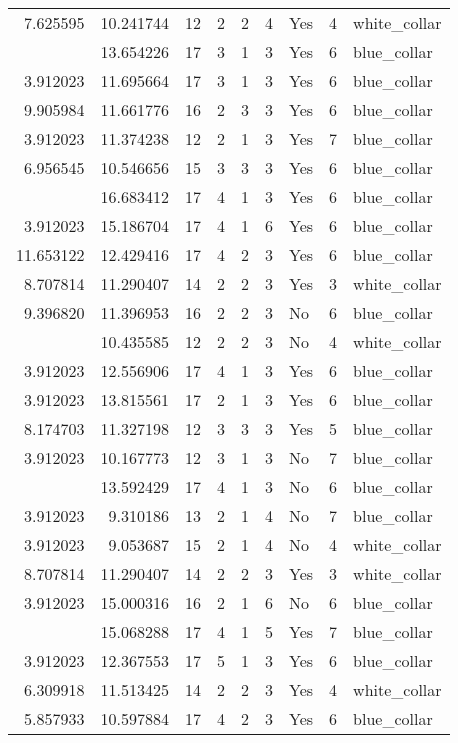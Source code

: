 \documentclass[
]{article}
\begin{document}
\begin{longtable}[t]{rrrrrllrl}
7.625595 & 10.241744 & 12 & 2 & 2 & 4 & Yes & 4 & white\_collar\\
\addlinespace
3.912023 & 13.654226 & 17 & 3 & 1 & 3 & Yes & 6 & blue\_collar\\
3.912023 & 11.695664 & 17 & 3 & 1 & 3 & Yes & 6 & blue\_collar\\
9.905984 & 11.661776 & 16 & 2 & 3 & 3 & Yes & 6 & blue\_collar\\
3.912023 & 11.374238 & 12 & 2 & 1 & 3 & Yes & 7 & blue\_collar\\
6.956545 & 10.546656 & 15 & 3 & 3 & 3 & Yes & 6 & blue\_collar\\
\addlinespace
3.912023 & 16.683412 & 17 & 4 & 1 & 3 & Yes & 6 & blue\_collar\\
3.912023 & 15.186704 & 17 & 4 & 1 & 6 & Yes & 6 & blue\_collar\\
11.653122 & 12.429416 & 17 & 4 & 2 & 3 & Yes & 6 & blue\_collar\\
8.707814 & 11.290407 & 14 & 2 & 2 & 3 & Yes & 3 & white\_collar\\
9.396820 & 11.396953 & 16 & 2 & 2 & 3 & No & 6 & blue\_collar\\
\addlinespace
4.248495 & 10.435585 & 12 & 2 & 2 & 3 & No & 4 & white\_collar\\
3.912023 & 12.556906 & 17 & 4 & 1 & 3 & Yes & 6 & blue\_collar\\
3.912023 & 13.815561 & 17 & 2 & 1 & 3 & Yes & 6 & blue\_collar\\
8.174703 & 11.327198 & 12 & 3 & 3 & 3 & Yes & 5 & blue\_collar\\
3.912023 & 10.167773 & 12 & 3 & 1 & 3 & No & 7 & blue\_collar\\
\addlinespace
3.912023 & 13.592429 & 17 & 4 & 1 & 3 & No & 6 & blue\_collar\\
3.912023 & 9.310186 & 13 & 2 & 1 & 4 & No & 7 & blue\_collar\\
3.912023 & 9.053687 & 15 & 2 & 1 & 4 & No & 4 & white\_collar\\
8.707814 & 11.290407 & 14 & 2 & 2 & 3 & Yes & 3 & white\_collar\\
3.912023 & 15.000316 & 16 & 2 & 1 & 6 & No & 6 & blue\_collar\\
\addlinespace
3.912023 & 15.068288 & 17 & 4 & 1 & 5 & Yes & 7 & blue\_collar\\
3.912023 & 12.367553 & 17 & 5 & 1 & 3 & Yes & 6 & blue\_collar\\
6.309918 & 11.513425 & 14 & 2 & 2 & 3 & Yes & 4 & white\_collar\\
5.857933 & 10.597884 & 17 & 4 & 2 & 3 & Yes & 6 & blue\_collar\\

\end{longtable}
\end{document}
